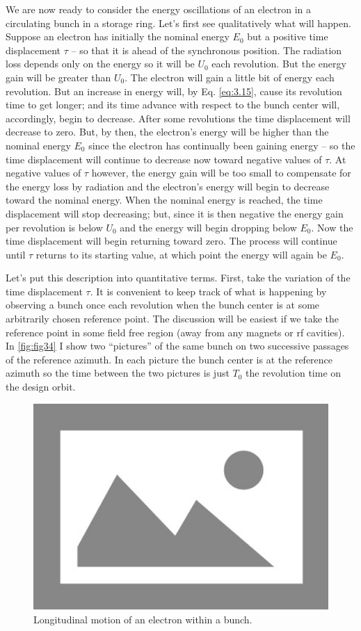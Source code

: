 We are now ready to consider the energy oscillations of an electron in a circulating bunch in a storage ring. Let's first see qualitatively what will happen. Suppose an electron has initially the nominal energy $E_0$ but a positive time displacement $\tau$ -- so that it is ahead of the synchronous position. The radiation loss depends only on the energy so it will be $U_0$ each revolution. But the energy gain will be greater than $U_0$. The electron will gain a little bit of energy each revolution. But an increase in energy will, by Eq. \eqref{eq:3.15}, cause its revolution time to get longer; and its time advance with respect to the bunch center will, accordingly, begin to decrease. After some revolutions the time displacement will decrease to zero. But, by then, the electron's energy will be higher than the nominal energy $E_0$ since the electron has continually been gaining energy -- so the time displacement will continue to decrease now toward negative values of $\tau$. At negative values of $\tau$ however, the energy gain will be too small to compensate for the energy loss by radiation and the electron's energy will begin to decrease toward the nominal energy. When the nominal energy is reached, the time displacement will stop decreasing; but, since it is then negative the energy gain per revolution is below $U_0$ and the energy will begin dropping below $E_0$. Now the time displacement will begin returning toward zero. The process will continue until $\tau$ returns to its starting value, at which point the energy will again be $E_0$.

Let's put this description into quantitative terms. First, take the variation of the time displacement $\tau$. It is convenient to keep track of what is happening by observing a bunch once each revolution when the bunch center is at some arbitrarily chosen reference point. The discussion will be easiest if we take the reference point in some field free region (away from any magnets or rf cavities). In \autoref{fig:fig34} I show two “pictures” of the same bunch on two successive passages of the reference azimuth. In each picture the bunch center is at the reference azimuth so the time between the two pictures is just $T_0$ the revolution time on the design orbit.
 
\begin{figure}[!htb]
	\centering
	\includegraphics[width=0.6\linewidth]{./Figuras/placeholder.png}
	\caption{Longitudinal motion of an electron within a bunch.}
	\label{fig:fig34}
\end{figure}

